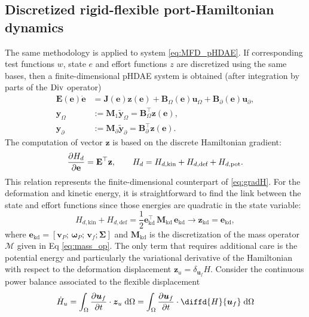 \subsection{Discretized rigid-flexible port-Hamiltonian dynamics}

The same methodology is applied to system \eqref{eq:MFD_pHDAE}. If corresponding test functions $w$, state $e$ and effort functions $z$ are discretized using the same bases, then a finite-dimensional pHDAE system is obtained (after integration by parts of the ${\operatorname*{Div}}$ operator)
\begin{equation}
\begin{aligned}
\mathbf{E}(\mathbf{e}) \dot{\mathbf{e}} &= \mathbf{J}(\mathbf{e}) \mathbf{z}(\mathbf{e}) + \mathbf{B}_\Omega(\mathbf{e}) \mathbf{u}_\Omega + \mathbf{B}_\partial(\mathbf{e}) \mathbf{u}_\partial, \\
\mathbf{y}_\Omega &:= \mathbf{M}_1 \widetilde{\mathbf{y}}_\Omega = \mathbf{B}_\Omega^\top \mathbf{z}(\mathbf{e}),  \\
\mathbf{y}_\partial &:= \mathbf{M}_\partial \widetilde{\mathbf{y}}_\partial = \mathbf{B}_\partial^\top \mathbf{z}(\mathbf{e}).
\end{aligned}
\end{equation}
The computation of vector $\mathbf{z}$ is based on the discrete Hamiltonian  gradient:
\[
\diffp{H_d}{\mathbf{e}} = \mathbf{E}^\top \mathbf{z}, \qquad H_d = H_{d, \text{kin}}+H_{d, \text{def}} +H_{d, \text{pot}}.
\]
This relation represents the finite-dimensional counterpart of \eqref{eq:gradH}. For the deformation and kinetic energy, it is straightforward to find the link between the state and effort functions since those energies are quadratic in the state variable:
\begin{equation}
H_{d, \text{kin}} + H_{d, \text{def}} = \frac{1}{2} \mathbf{e}_{\text{kd}}^\top \, \mathbf{M}_{\text{kd}} \, \mathbf{e}_{\text{kd}} \longrightarrow \mathbf{z}_{\text{kd}} = \mathbf{e}_{\text{kd}},
\end{equation}
where $\mathbf{e}_{\text{kd}} = [\mathbf{v}_P; \, \bm{\omega}_P; \, \mathbf{v}_f; \bm{\Sigma}]$ and $\mathbf{M}_{\text{kd}}$ is the discretization of the mass operator $\bm{\mathcal{M}}$ given in Eq \eqref{eq:mass_op}.
The only term that requires additional care is the potential energy and particularly the variational derivative of the Hamiltonian with respect to the deformation displacement $\bm{z}_{u}=\delta_{\bm{u}_f} H$.  Consider the continuous power balance associated to the flexible displacement
\[
\dot{H}_u = \int_{\Omega} \diffp{\bm{u}_f}{t} \cdot \bm{z}_{u} \d{\Omega} = \int_{\Omega} \diffp{\bm{u}_f}{t} \cdot \diffd{H}{\bm{u}_f} \d{\Omega}
\]
